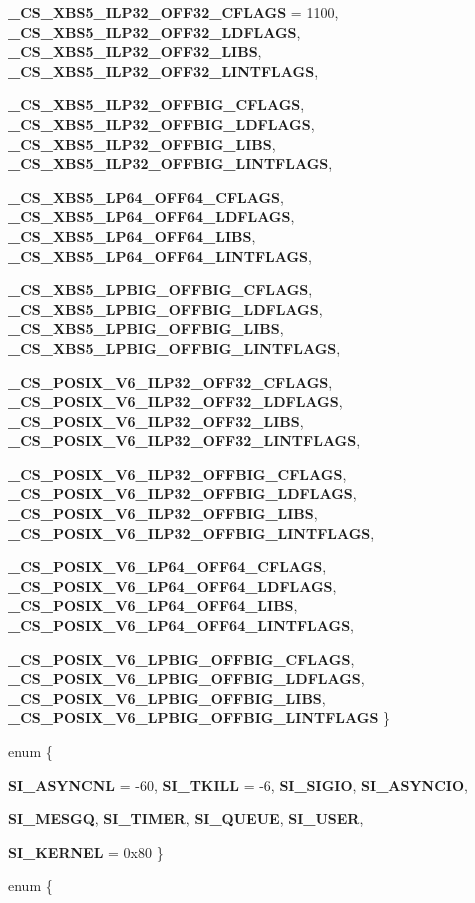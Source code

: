 \begin{DoxyCompactItemize}
\par
{\bf \_\-CS\_\-XBS5\_\-ILP32\_\-OFF32\_\-CFLAGS} =  1100, 
{\bf \_\-CS\_\-XBS5\_\-ILP32\_\-OFF32\_\-LDFLAGS}, 
{\bf \_\-CS\_\-XBS5\_\-ILP32\_\-OFF32\_\-LIBS}, 
{\bf \_\-CS\_\-XBS5\_\-ILP32\_\-OFF32\_\-LINTFLAGS}, 
\par
{\bf \_\-CS\_\-XBS5\_\-ILP32\_\-OFFBIG\_\-CFLAGS}, 
{\bf \_\-CS\_\-XBS5\_\-ILP32\_\-OFFBIG\_\-LDFLAGS}, 
{\bf \_\-CS\_\-XBS5\_\-ILP32\_\-OFFBIG\_\-LIBS}, 
{\bf \_\-CS\_\-XBS5\_\-ILP32\_\-OFFBIG\_\-LINTFLAGS}, 
\par
{\bf \_\-CS\_\-XBS5\_\-LP64\_\-OFF64\_\-CFLAGS}, 
{\bf \_\-CS\_\-XBS5\_\-LP64\_\-OFF64\_\-LDFLAGS}, 
{\bf \_\-CS\_\-XBS5\_\-LP64\_\-OFF64\_\-LIBS}, 
{\bf \_\-CS\_\-XBS5\_\-LP64\_\-OFF64\_\-LINTFLAGS}, 
\par
{\bf \_\-CS\_\-XBS5\_\-LPBIG\_\-OFFBIG\_\-CFLAGS}, 
{\bf \_\-CS\_\-XBS5\_\-LPBIG\_\-OFFBIG\_\-LDFLAGS}, 
{\bf \_\-CS\_\-XBS5\_\-LPBIG\_\-OFFBIG\_\-LIBS}, 
{\bf \_\-CS\_\-XBS5\_\-LPBIG\_\-OFFBIG\_\-LINTFLAGS}, 
\par
{\bf \_\-CS\_\-POSIX\_\-V6\_\-ILP32\_\-OFF32\_\-CFLAGS}, 
{\bf \_\-CS\_\-POSIX\_\-V6\_\-ILP32\_\-OFF32\_\-LDFLAGS}, 
{\bf \_\-CS\_\-POSIX\_\-V6\_\-ILP32\_\-OFF32\_\-LIBS}, 
{\bf \_\-CS\_\-POSIX\_\-V6\_\-ILP32\_\-OFF32\_\-LINTFLAGS}, 
\par
{\bf \_\-CS\_\-POSIX\_\-V6\_\-ILP32\_\-OFFBIG\_\-CFLAGS}, 
{\bf \_\-CS\_\-POSIX\_\-V6\_\-ILP32\_\-OFFBIG\_\-LDFLAGS}, 
{\bf \_\-CS\_\-POSIX\_\-V6\_\-ILP32\_\-OFFBIG\_\-LIBS}, 
{\bf \_\-CS\_\-POSIX\_\-V6\_\-ILP32\_\-OFFBIG\_\-LINTFLAGS}, 
\par
{\bf \_\-CS\_\-POSIX\_\-V6\_\-LP64\_\-OFF64\_\-CFLAGS}, 
{\bf \_\-CS\_\-POSIX\_\-V6\_\-LP64\_\-OFF64\_\-LDFLAGS}, 
{\bf \_\-CS\_\-POSIX\_\-V6\_\-LP64\_\-OFF64\_\-LIBS}, 
{\bf \_\-CS\_\-POSIX\_\-V6\_\-LP64\_\-OFF64\_\-LINTFLAGS}, 
\par
{\bf \_\-CS\_\-POSIX\_\-V6\_\-LPBIG\_\-OFFBIG\_\-CFLAGS}, 
{\bf \_\-CS\_\-POSIX\_\-V6\_\-LPBIG\_\-OFFBIG\_\-LDFLAGS}, 
{\bf \_\-CS\_\-POSIX\_\-V6\_\-LPBIG\_\-OFFBIG\_\-LIBS}, 
{\bf \_\-CS\_\-POSIX\_\-V6\_\-LPBIG\_\-OFFBIG\_\-LINTFLAGS}
 \}
\item 
enum \{ \par
{\bf SI\_\-ASYNCNL} =  -\/60, 
{\bf SI\_\-TKILL} =  -\/6, 
{\bf SI\_\-SIGIO}, 
{\bf SI\_\-ASYNCIO}, 
\par
{\bf SI\_\-MESGQ}, 
{\bf SI\_\-TIMER}, 
{\bf SI\_\-QUEUE}, 
{\bf SI\_\-USER}, 
\par
{\bf SI\_\-KERNEL} =  0x80
 \}
\item 
enum \{ \par

\end{DoxyCompactItemize}

